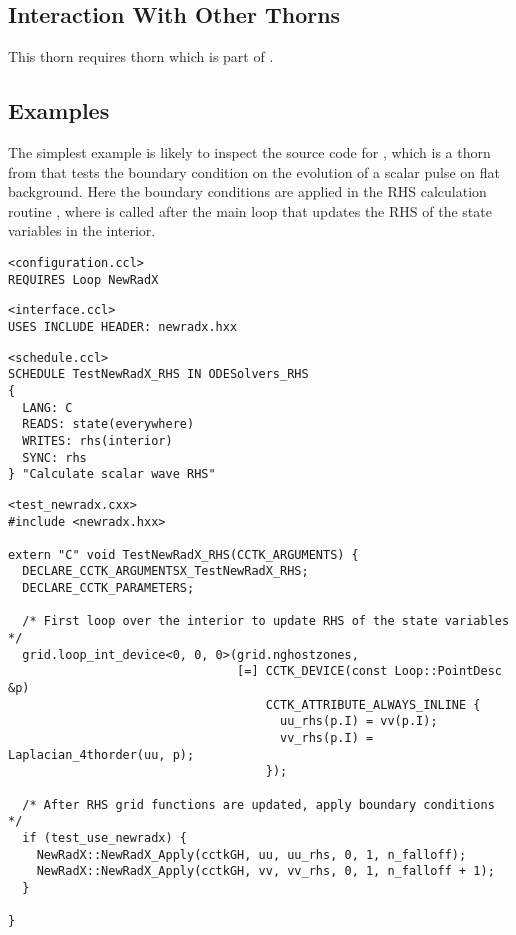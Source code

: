 \subsection{Interaction With Other Thorns}
This thorn requires thorn  which is part of
.

\subsection{Examples}
The simplest example is likely to inspect the source code for
, which is a thorn from  that tests the
boundary condition on the evolution of a scalar pulse on flat background.
Here the boundary conditions are applied in the RHS calculation routine
, where  is called after the main
loop that updates the RHS of the state variables in the interior.

\begin{verbatim}
<configuration.ccl>
REQUIRES Loop NewRadX
\end{verbatim}

\begin{verbatim}
<interface.ccl>
USES INCLUDE HEADER: newradx.hxx
\end{verbatim}

\begin{verbatim}
<schedule.ccl>
SCHEDULE TestNewRadX_RHS IN ODESolvers_RHS
{
  LANG: C
  READS: state(everywhere)
  WRITES: rhs(interior)
  SYNC: rhs
} "Calculate scalar wave RHS"
\end{verbatim}

\begin{verbatim}
<test_newradx.cxx>
#include <newradx.hxx>

extern "C" void TestNewRadX_RHS(CCTK_ARGUMENTS) {
  DECLARE_CCTK_ARGUMENTSX_TestNewRadX_RHS;
  DECLARE_CCTK_PARAMETERS;

  /* First loop over the interior to update RHS of the state variables */
  grid.loop_int_device<0, 0, 0>(grid.nghostzones,
                                [=] CCTK_DEVICE(const Loop::PointDesc &p)
                                    CCTK_ATTRIBUTE_ALWAYS_INLINE {
                                      uu_rhs(p.I) = vv(p.I);
                                      vv_rhs(p.I) = Laplacian_4thorder(uu, p);
                                    });

  /* After RHS grid functions are updated, apply boundary conditions */
  if (test_use_newradx) {
    NewRadX::NewRadX_Apply(cctkGH, uu, uu_rhs, 0, 1, n_falloff);
    NewRadX::NewRadX_Apply(cctkGH, vv, vv_rhs, 0, 1, n_falloff + 1);
  }

}
\end{verbatim}


